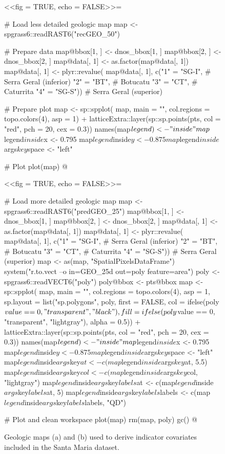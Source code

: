 \begin{figure}[!ht]
 \centering
 \begin{minipage}[b]{63mm}
  \subcaption{}
  \centering
  <<fig = TRUE, echo = FALSE>>=
   
   # Load less detailed geologic map
   map <- spgrass6::readRAST6("recGEO_50")
   
   # Prepare data
   map@bbox[1, ] <- dnos_bbox[1, ]
   map@bbox[2, ] <- dnos_bbox[2, ]
   map@data[, 1] <- as.factor(map@data[, 1])
   map@data[, 1] <- plyr::revalue(
     map@data[, 1], c("1" = "SG-I",  # Serra Geral (inferior)
                      "2" = "BT",    # Botucatu
                      "3" = "CT",    # Caturrita
                      "4" = "SG-S")) # Serra Geral (superior)
   
   # Prepare plot
   map <- sp::spplot(
     map, main = "", col.regions = topo.colors(4), asp = 1) +
     latticeExtra::layer(sp::sp.points(pts, col = "red", pch = 20, cex = 0.3))
   names(map$legend) <- "inside"
   map$legend$inside$x <- 0.795
   map$legend$inside$y <- 0.875
   map$legend$inside$args$key$space <- "left"
   
   # Plot
   plot(map)
  @
 \end{minipage}
 
 \begin{minipage}[b]{63mm}
  \subcaption{}
  \centering
  <<fig = TRUE, echo = FALSE>>=
   
   # Load more detailed geologic map
   map <- spgrass6::readRAST6("predGEO_25")
   map@bbox[1, ] <- dnos_bbox[1, ]
   map@bbox[2, ] <- dnos_bbox[2, ]
   map@data[, 1] <- as.factor(map@data[, 1])
   map@data[, 1] <- plyr::revalue(
     map@data[, 1], c("1" = "SG-I",  # Serra Geral (inferior)
                      "2" = "BT",    # Botucatu
                      "3" = "CT",    # Caturrita
                      "4" = "SG-S")) # Serra Geral (superior)
   map <- as(map, "SpatialPixelsDataFrame")
   system("r.to.vect --o in=GEO_25d out=poly feature=area")
   poly <- spgrass6::readVECT6("poly")
   poly@bbox <- pts@bbox
   map <- sp::spplot(
     map, main = "", col.regions = topo.colors(4), asp = 1, 
     sp.layout = list("sp.polygons", poly, first = FALSE, 
     col = ifelse(poly$value == 0, "transparent", " black"), 
     fill = ifelse(poly$value == 0, "transparent", "lightgray"), alpha = 0.5)) +
     latticeExtra::layer(sp::sp.points(pts, col = "red", pch = 20, cex = 0.3))
   names(map$legend) <- "inside"
   map$legend$inside$x <- 0.795
   map$legend$inside$y <- 0.875
   map$legend$inside$args$key$space <- "left"
   map$legend$inside$args$key$at <- c(map$legend$inside$args$key$at, 5.5)
   map$legend$inside$args$key$col <- c(map$legend$inside$args$key$col, "lightgray")
   map$legend$inside$args$key$labels$at <- c(map$legend$inside$args$key$labels$at, 5)
   map$legend$inside$args$key$labels$labels <- c(map$legend$inside$args$key$labels$labels, "QD")
   
   # Plot and clean workspace
   plot(map)
   rm(map, poly)
   gc()
  @
 \end{minipage} 
 \caption{Geologic maps (a) \geoOld{} and (b) \geoNew{} used to derive indicator covariates included in the 
 Santa Maria dataset.}
\label{fig:covar-data-geo-maps}
\end{figure}

